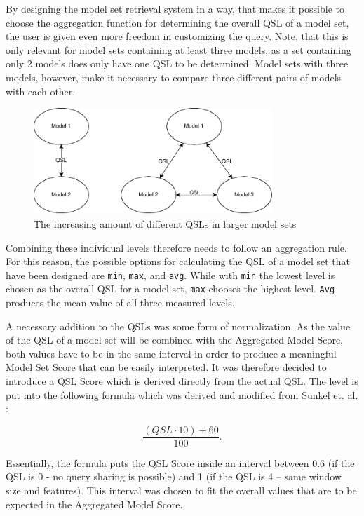 By designing the model set retrieval system in a way, that makes it possible to choose the aggregation function for determining the overall QSL of a model set, the user is given even more freedom in customizing the query. Note, that this is only relevant for model sets containing at least three models, as a set containing only 2 models does only have one QSL to be determined. Model sets with three models, however, make it necessary to compare three different pairs of models with each other.

\begin{figure}[htbp]
  \centering
\includegraphics[height=4cm]{graphics/qsl}
  \caption{The increasing amount of different QSLs in larger model sets}
  \label{figure}
\end{figure}

Combining these individual levels therefore needs to follow an aggregation rule. For this reason, the possible options for calculating the QSL of a model set that have been designed are \texttt{min}, \texttt{max}, and \texttt{avg}. While with \texttt{min} the lowest level is chosen as the overall QSL for a model set, \texttt{max} chooses the highest level. \texttt{Avg} produces the mean value of all three measured levels.

A necessary addition to the QSLs was some form of normalization. As the value of the QSL of a model set will be combined with the Aggregated Model Score, both values have to be in the same interval in order to produce a meaningful Model Set Score that can be easily interpreted. It was therefore decided to introduce a QSL Score which is derived directly from the actual QSL. The level is put into the following formula which was derived and modified from Sünkel et. al. \cite{sunkel2022}:

\begin{equation*}
\frac{(QSL \cdot 10) + 60}{100}.
\label{mse}
\end{equation*}

Essentially, the formula puts the QSL Score inside an interval between 0.6 (if the QSL is 0 - no query sharing is possible) and 1 (if the QSL is 4 – same window size and features). This interval was chosen to fit the overall values that are to be expected in the Aggregated Model Score. 

